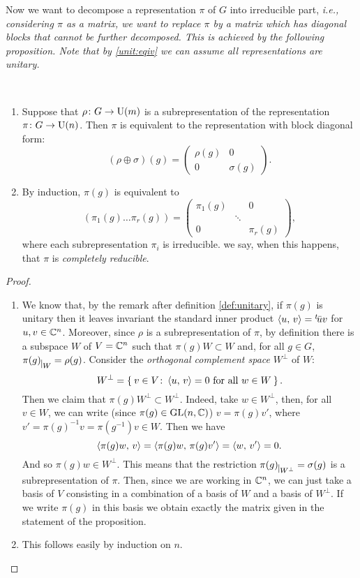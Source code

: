 Now we want to decompose a representation $\pi$ of $G$ into irreducible part, \it{i.e.}, considering $\pi$ as a matrix, we want to replace $\pi$ by a matrix which has diagonal blocks that cannot be further decomposed. This is achieved by the following proposition.
Note that by \ref{unit:eqiv} we can assume all representations are unitary.
\begin{prop}~ 
\label{thm:complred}
\begin{enumerate}
\item Suppose that $\rho\colon G\rightarrow \operatorname{U}(m)$ is a subrepresentation of the representation $\pi\colon G\rightarrow \operatorname{U}(n)$. Then $\pi$ is equivalent to the representation with block diagonal form:
\[(\rho \oplus \sigma)(g)=
\begin{pmatrix}
\rho(g) & 0 \\
0 		& \sigma(g)
\end{pmatrix}.
\]
\item By induction, $\pi(g)$ is equivalent to
\[
(\pi_1(g)\dots \pi_r(g))= 
\begin{pmatrix}
\pi_1(g)  &{} &0\\
{} &\ddots &{} \\
0 &{}  &\pi_r(g)
\end{pmatrix},
\]
where each subrepresentation $\pi_i$  is irreducible. we say, when this happens, that $\pi$ is \emph{completely reducible}. 
\end{enumerate}
\end{prop}
\begin{proof}~ 
\begin{enumerate}
\item We know that, by the remark after definition \ref{def:unitary}, if $\pi(g)$ is unitary then it leaves invariant the standard inner product $\braket{u,\, v}={}^t\!\bar{u}v$ for $u,v \in {\mathbb C}^n$. Moreover, since $\rho$ is a subrepresentation of $\pi$, by definition there is a subspace $W$ of $V={\mathbb C}^n$ such that $\pi(g)W\subset W$ and, for all $g\in G$, $\pi(g)_{\mkern 1mu \vrule height 2ex\mkern2mu W}= \rho(g)$.  Consider the \emph{orthogonal complement space} $W^\perp$ of $W$:
\[
W^{\perp}= \Set{v \in V \colon \braket{u, \, v}=0 \text{ for all } w \in W}.
\]
Then we claim that $\pi(g)W^{\perp}\subset W^{\perp}$. Indeed, take $w\in W^{\perp}$, then, for all $v\in W$, we can write (since $\pi(g) \in \operatorname{GL}(n,{\mathbb C})$) $v=\pi(g)v'$, where $v'=\pi(g)^{-1}v=\pi(g^{-1})v \in W$. Then we have 
\[
\braket{\pi(g)w,\, v}=\braket{\pi(g)w,\, \pi(g)v'}=\braket{w,\, v'}=0.
\]
And so $\pi(g)w\in W^{\perp}$. This means that the restriction $\pi(g)_{\mkern 1mu \vrule height 2ex\mkern2mu W^{\perp}}= \sigma(g)$ is a subrepresentation of $\pi$.  Then, since we are working in ${\mathbb C}^n$, we can just take a basis of $V$ consisting in a combination of a basis of $W$ and a basis of $W^{\perp}$. If we write $\pi(g)$ in this basis we obtain exactly the matrix given in the statement of the proposition.
\item This follows easily by induction on $n$.
\end{enumerate}
\end{proof}

